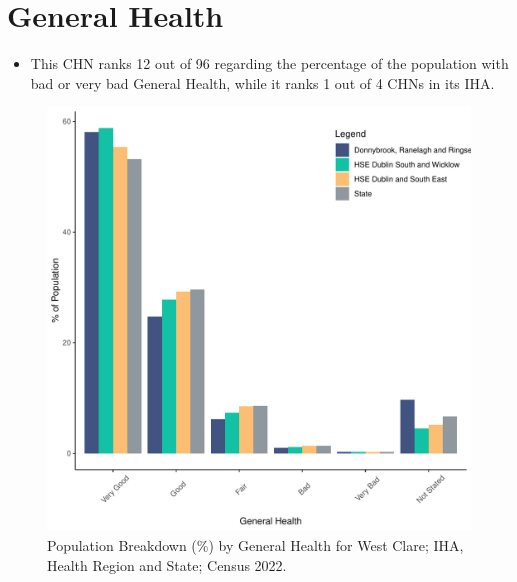 \documentclass{article}
\begin{document}
\pagebreak

\section{General Health}\label{sect:GenHealth}
\begin{itemize}
\item  This CHN ranks  12 out of 96 regarding the percentage of the population with bad or very bad General Health, while it ranks   1 out of 4 CHNs in its IHA.
\end{itemize}
\begin{figure}[h]
	\centering
	\includegraphics[width = 150mm]{../figures/GenED.pdf}
	\caption{Population Breakdown (\%) by General Health for West Clare; IHA, Health Region and State;  Census 2022.}
	\label{fig:2ae19629-1a6a-13a3-e055-000000000001}
	\end{figure}
\end{document}
